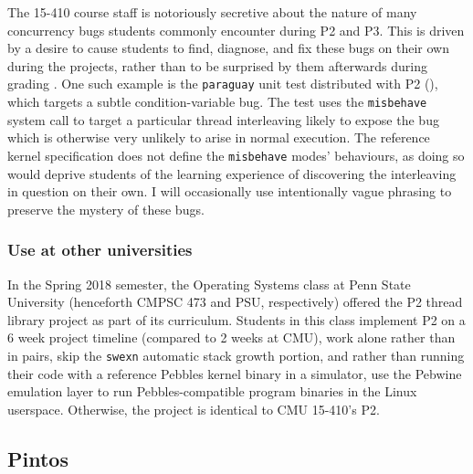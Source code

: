 The 15-410 course staff is notoriously secretive about the nature of many concurrency bugs
students commonly encounter during P2 and P3.
This is driven by a desire to cause students to find, diagnose, and fix these bugs on their own during the projects,
rather than to be surprised by them afterwards during grading
\cite{de0u-2018}.
%
One such example is the {\tt paraguay} unit test distributed with P2 (\sect{\ref{sec:education-pebbles-tests}}),
which targets a subtle condition-variable bug.
The test uses the {\tt misbehave} system call to target a particular thread interleaving likely to expose the bug
which is otherwise very unlikely to arise in normal execution.
The reference kernel specification \cite{kspec} does not define the {\tt misbehave} modes' behaviours,
as doing so would deprive students of the learning experience of discovering the interleaving in question on their own.
%
I will occasionally use intentionally vague phrasing to preserve the mystery of these bugs.

\subsubsection{Use at other universities}
\label{sec:overview-psu}

\newcommand\psuos{CMPSC 473\xspace}

In the Spring 2018 semester,
the Operating Systems class at Penn State University (henceforth \psuos and PSU, respectively)
offered the P2 thread library project as part of its curriculum.
Students in this class implement P2
on a 6 week project timeline (compared to 2 weeks at CMU),
work alone rather than in pairs,
skip the {\tt swexn} automatic stack growth portion,
and rather than running their code with a reference Pebbles kernel binary in a simulator,
use the Pebwine emulation layer \cite{pebwine}
to run Pebbles-compatible program binaries in the Linux userspace.
Otherwise, the project is identical to CMU 15-410's P2.

\subsection{Pintos}
\label{sec:overview-pintos}

\newcommand\uchos{CMSC 23000\xspace}

